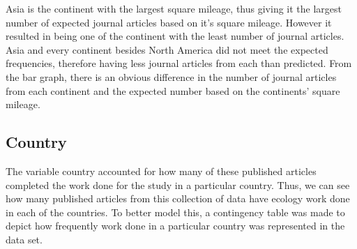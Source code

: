 \documentclass[12pt, letterpaper]{article}
\begin{document}
Asia is the continent with the largest square mileage, thus giving it the largest number of expected journal articles based on it's square mileage. However it resulted in being one of the continent with the least number of journal articles. Asia and every continent besides North America did not meet the expected frequencies, therefore having less journal articles from each than predicted. From the bar graph, there is an obvious difference in the number of journal articles from each continent and the expected number based on the continents' square mileage. 

\subsection{Country}
The variable country accounted for how many of these published articles completed the work done for the study in a particular country. Thus, we can see how many published articles from this collection of data have ecology work done in each of the countries. To better model this, a contingency table was made to depict how frequently work done in a particular country was represented in the data set.
\end{document}
